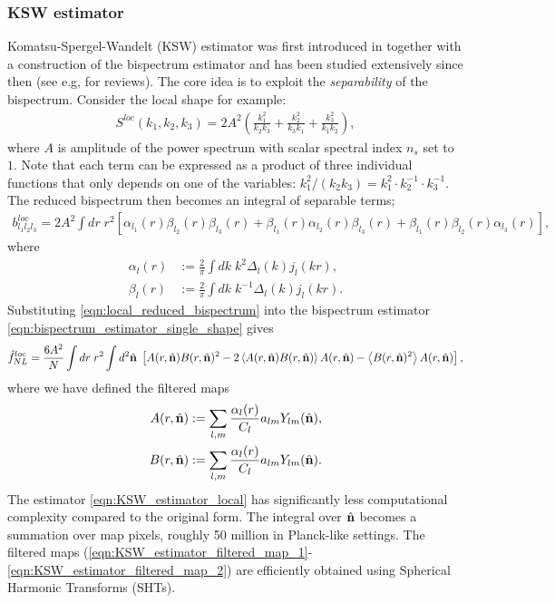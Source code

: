 \subsubsection*{KSW estimator}
Komatsu-Spergel-Wandelt (KSW) estimator was first introduced in \cite{Komatsu2005} together with a construction of the bispectrum estimator and has been studied extensively since then \cite{Creminelli2006limits,Babich2005optimal,Creminelli2007estimators} (see e.g, \cite{Komatsu2010} for reviews). The core idea is to exploit the \textit{separability} of the bispectrum. Consider the local shape for example:
\begin{align}
	S^{loc}(k_1, k_2, k_3) = 2A^2 \left( \frac{k_1^2}{k_2 k_3} + \frac{k_2^2}{k_3 k_1} +  \frac{k_3^2}{k_1 k_2} \right),
\end{align}
where $A$ is amplitude of the power spectrum with scalar spectral index $n_s$ set to $1$. Note that each term can be expressed as a product of three individual functions that only depends on one of the variables: $k_1^2/(k_2 k_3) = k_1^2 \cdot k_2^{-1} \cdot k_3^{-1}$. The reduced bispectrum then becomes an integral of separable terms;
\begin{align}
	b^{loc}_{l_1 l_2 l_3} = 2A^2 \int dr \; r^2 \left[ \alpha_{l_1}(r) \beta_{l_2}(r) \beta_{l_3}(r) + \beta_{l_1}(r) \alpha_{l_2}(r) \beta_{l_3}(r) + \beta_{l_1}(r) \beta_{l_2}(r) \alpha_{l_3}(r) \right], \label{eqn:local_reduced_bispectrum}
\end{align}
where
\begin{align}
	\alpha_l(r) &:= \frac{2}{\pi} \int dk \; k^2 \Delta_l(k) j_l(kr), \label{def:KSW_estimator_alpha}\\
	\beta_l(r) &:= \frac{2}{\pi} \int dk \; k^{-1} \Delta_l(k) j_l(kr).
\end{align}
Substituting \eqref{eqn:local_reduced_bispectrum} into the bispectrum estimator \eqref{eqn:bispectrum_estimator_single_shape} gives
\begin{align}
	\hat{f}^{loc}_{NL} = \frac{6A^2}{N} \int dr \; r^2 \int d^2 \hat{\mathbf{n}} \; \left[ A(r,\hat{\mathbf{n}}) B(r,\hat{\mathbf{n}})^2 - 2 \left <A(r,\hat{\mathbf{n}}) B(r,\hat{\mathbf{n}}) \right> A(r,\hat{\mathbf{n}}) - \left< B(r,\hat{\mathbf{n}})^2 \right> A(r,\hat{\mathbf{n}})  \right], \label{eqn:KSW_estimator_local}
\end{align}
where we have defined the filtered maps
\begin{align}
	A(r,\hat{\mathbf{n}}) &:= \sum_{l,m} \frac{\alpha_l(r)}{C_l} a_{lm} Y_{lm}(\hat{\mathbf{n}}), \label{eqn:KSW_estimator_filtered_map_1}\\
	B(r,\hat{\mathbf{n}}) &:= \sum_{l,m} \frac{\alpha_l(r)}{C_l} a_{lm} Y_{lm}(\hat{\mathbf{n}}). \label{eqn:KSW_estimator_filtered_map_2}
\end{align}
The estimator \eqref{eqn:KSW_estimator_local} has significantly less computational complexity compared to the original form. The integral over $\hat{\mathbf{n}}$ becomes a summation over map pixels, roughly 50 million in Planck-like settings. The filtered maps (\ref{eqn:KSW_estimator_filtered_map_1}-\ref{eqn:KSW_estimator_filtered_map_2}) are efficiently obtained using Spherical Harmonic Transforms (SHTs).

